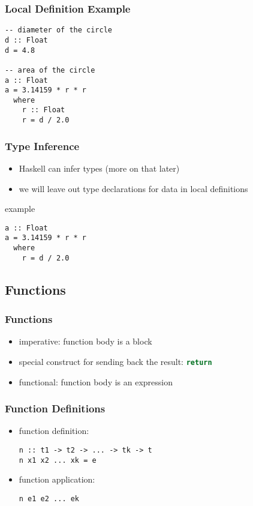 \documentclass[dvipsnames]{beamer}
\theoremstyle{plain}
\begin{document}
\begin{frame}[fragile]
  \frametitle{Local Definition Example}

  \begin{lstlisting}
-- diameter of the circle
d :: Float
d = 4.8

-- area of the circle
a :: Float
a = 3.14159 * r * r
  where
    r :: Float
    r = d / 2.0
  \end{lstlisting}
\end{frame}

\begin{frame}[fragile]
  \frametitle{Type Inference}

  \begin{itemize}
    \item Haskell can infer types (more on that later)
    \item we will leave out type declarations for data in local definitions
  \end{itemize}

  \begin{exampleblock}{example}
    \begin{lstlisting}
a :: Float
a = 3.14159 * r * r
  where
    r = d / 2.0
    \end{lstlisting}
  \end{exampleblock}
\end{frame}

\subsection{Functions}

\begin{frame}
  \frametitle{Functions}

  \begin{itemize}
    \item imperative: function body is a block
    \item special construct for sending back the result:
      \lstinline[language=Python]{return}

    \bigskip
    \item functional: function body is an expression
  \end{itemize}
\end{frame}

\begin{frame}[fragile]
  \frametitle{Function Definitions}

  \begin{itemize}
    \item function definition:
    \begin{lstlisting}[style=syntax]
n :: t1 -> t2 -> ... -> tk -> t
n x1 x2 ... xk = e
    \end{lstlisting}

    \pause
    \bigskip
    \item function application:
    \begin{lstlisting}[style=syntax]
n e1 e2 ... ek
    \end{lstlisting}
  \end{itemize}
\end{frame}
\end{document}
